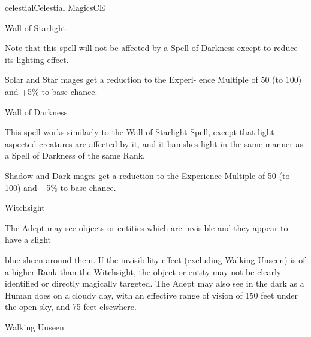 \begin{College}[1.3]{celestial}{Celestial Magics}{CE}
\begin{spell}[G-5]{Wall of Starlight }
\begin{effects}
Note  that this  spell  will  not  be  affected  by  a  Spell 
of Darkness except to reduce its lighting effect. 

Solar and Star mages get a reduction to the Experi-
ence  Multiple  of  50  (to  100)  and  +5\%  to  base 
chance. 

\end{effects}
\end{spell}

\begin{spell}[G-6]{Wall of Darkness }

\begin{effects}
 This  spell  works  similarly  to  the  Wall  of 
Starlight Spell, except that light aspected creatures 
are affected by it, and it banishes light in the same 
manner as a Spell of Darkness of the same Rank. 

Shadow  and  Dark  mages  get  a  reduction  to  the 
Experience  Multiple  of  50  (to  100)  and  +5\%  to 
base chance. 
\end{effects}
\end{spell}

\begin{spell}[G-7]{Witchsight }

\begin{effects}
 The  Adept  may  see  objects  or  entities 
which are invisible and they appear to have a slight 

blue  sheen  around  them.  If  the  invisibility  effect 
(excluding  Walking  Unseen)  is  of  a  higher  Rank 
than the Witchsight, the object or entity may not be 
clearly  identified  or  directly  magically  targeted. 
The  Adept  may  also  see  in  the  dark  as  a  Human 
does  on  a  cloudy  day,  with  an  effective  range  of 
vision of 150 feet under the open sky, and 75 feet 
elsewhere. 
\end{effects}
\end{spell}

\begin{spell}[G-8]{Walking Unseen }


\end{spell}
\end{College}
